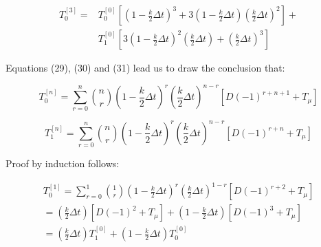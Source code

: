 \documentclass{article}
\begin{document}
\begin{equation}
\begin{split}
    T_0^{[3]} = &  T_0^{[0]}\left[\left(1-\frac{k}{2}\Delta t\right)^3+3\left(1-\frac{k}{2}\Delta t\right)\left(\frac{k}{2}\Delta t\right)^2\right] + \\ & T_1^{[0]}\left[3\left(1-\frac{k}{2}\Delta t\right)^2\left(\frac{k}{2}\Delta t\right)+\left(\frac{k}{2}\Delta t\right)^3\right]
\end{split}
\end{equation}

Equations (29), (30) and (31) lead us to draw the conclusion that:

\begin{equation}
        T_0^{[n]} =  \sum_{r=0}^{n}\binom{n}{r}\left(1-\frac{k}{2}\Delta t\right)^r\left(\frac{k}{2}\Delta t\right)^{n-r}\left[D(-1)^{r+n+1}+T_\mu\right]
\end{equation}

\begin{equation}
        T_1^{[n]} =  \sum_{r=0}^{n}\binom{n}{r}\left(1-\frac{k}{2}\Delta t\right)^r\left(\frac{k}{2}\Delta t\right)^{n-r}\left[D(-1)^{r+n}+T_\mu\right]
\end{equation}

Proof by induction follows:

\begin{equation}
\begin{split}
        T_0^{[1]} =  \sum_{r=0}^{1}\binom{1}{r}\left(1-\frac{k}{2}\Delta t\right)^r\left(\frac{k}{2}\Delta t\right)^{1-r}\left[D(-1)^{r+2}+T_\mu\right] \\ =  \left(\frac{k}{2}\Delta t\right)\left[D(-1)^2+T_\mu\right] + \left(1-\frac{k}{2}\Delta t\right)\left[D(-1)^3+T_\mu\right]
        \\ =  \left(\frac{k}{2}\Delta t\right)T_1^{[0]} + \left(1-\frac{k}{2}\Delta t\right)T_0^{[0]}
\end{split}
\end{equation}
\end{document}
